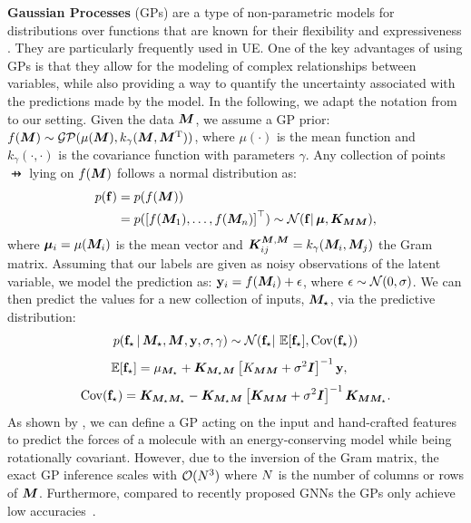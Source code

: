 \textbf{Gaussian Processes} (GPs) are a type of non-parametric models for distributions over functions that are known for their flexibility and expressiveness \cite{bishop, Jakkala2021DeepGP}. 
They are particularly frequently used in UE.
One of the key advantages of using GPs is that they allow for the modeling of complex relationships between variables, while also providing a way to quantify the uncertainty associated with the predictions made by the model.
In the following, we adapt the notation from \citet{Rasmussen2009GaussianPF} to our setting.
Given the data $\bm{M}$, we assume a GP prior: $f(\bm{M}) \sim \mathcal{GP}(\mu(\bm{M}), k_\gamma(\bm{M}, \bm{M}^{\operatorname{\text{T}}}))$, where $\mu(\cdot)$ is the mean function and $k_\gamma(\cdot, \cdot)$ is the covariance function with parameters $\gamma$. Any collection of points $\pfun$ lying on $f(\bm{M})$ follows a normal distribution as:
\begin{equation}
\begin{aligned}
	p(\mathbf{f}) &= p(f(\bm{M})) \\&= p(\left[f(\bm{M}_1), \dots, f(\bm{M}_n) \right]^\top)  \sim \mathcal{N} (\mathbf{f} \vert\, \bm{\mu}, \bm{K}_{\bm{M} \bm{M}}),
 \end{aligned}
\end{equation}
where $\bm{\mu}_i = \mu(\bm{M}_i)$ is the mean vector and $\bm{K}^{\bm{M}, \bm{M}}_{ij} = k_\gamma(\bm{M}_i, \bm{M}_j)$ the Gram matrix. Assuming that our labels are given as noisy observations of the latent variable, we model the prediction as: $\mathbf{y}_i = f(\bm{M}_i) + \epsilon$, where $\epsilon \sim \mathcal{N}(0, \sigma)$. We can then predict the values for a new collection of inputs, $\bm{M}_\star$, via the predictive distribution:
\begin{equation}
	p(\mathbf{f}_\star \,\vert \, \bm{M}_\star, \bm{M}, \mathbf{y}, \sigma, \gamma) \sim \mathcal{N} (\mathbf{f}_\star \vert\, \operatorname{\mathbb{E}} [\mathbf{f}_\star], \mathrm{Cov}(\mathbf{f}_\star))
\end{equation}
\begin{equation}
	\operatorname{\mathbb{E}} [\mathbf{f}_\star] = \mu_{\bm{M}_\star} + \bm{K}_{\bm{M}_\star \bm{M}} \left[K_{\bm{M} \bm{M}} + \sigma ^2 \bm{I} \right]^{-1} \mathbf{y}, \quad 
\end{equation}
\begin{equation}
	\mathrm{Cov}(\mathbf{f}_\star) =  \bm{K}_{\bm{M}_\star \bm{M}_\star} - \bm{K}_{\bm{M}_\star \bm{M}}\left[\bm{K}_{\bm{M} \bm{M}} + \sigma ^2 \bm{I}\right] ^{-1}\bm{K}_{\bm{M} \bm{M}_\star}.
\end{equation}
As shown by \citet{vandermause2020On}, we can define a GP acting on the input and hand-crafted features to predict the forces of a molecule with an energy-conserving model while being rotationally covariant. However, due to the inversion of the Gram matrix, the exact GP inference scales with $\mathcal{O}(N^3)$ where $N$ is the number of columns or rows of $\bm{M}$. Furthermore, compared to recently proposed GNNs the GPs only achieve low accuracies~\citep{gasteiger2021gemnet,batznerEquivariantGraphNeural2022}. 

